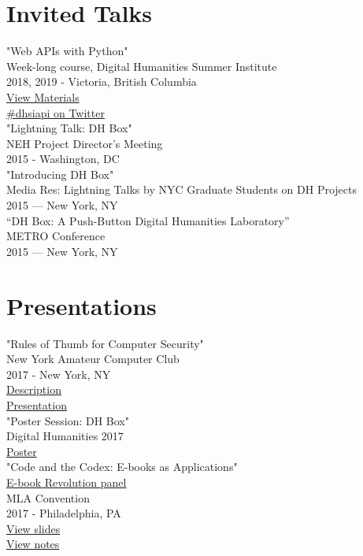 \documentclass[11pt]{article}
\begin{document}
\section*{Invited Talks}
\label{sec:orgheadline6}
"Web APIs with Python"\\
Week-long course, Digital Humanities Summer Institute\\
2018, 2019 - Victoria, British Columbia\\
\href{https://github.com/szweibel/DHSI-API-workshop#web-apis-with-python}{View Materials}\\
\href{https://twitter.com/search?q=\%2523dhsiapi&src=typd}{\#dhsiapi on Twitter}\\

"Lightning Talk: DH Box"\\
NEH Project Director's Meeting\\
2015 - Washington, DC\\

"Introducing DH Box"\\
Media Res: Lightning Talks by NYC Graduate Students on DH Projects\\
2015 — New York, NY\\

“DH Box: A Push-Button Digital Humanities Laboratory”\\
METRO Conference\\
2015 — New York, NY\\

\section*{Presentations}
\label{sec:orgheadline7}
"Rules of Thumb for Computer Security"\\
New York Amateur Computer Club\\
2017 - New York, NY\\
\href{http://nyacc.org/}{Description}\\
\href{http://htmlpreview.github.io/?https://github.com/smythp/security-workshop/blob/master/presentation/index.html#/sec-title-slide}{Presentation}\\

"Poster Session: DH Box"\\
Digital Humanities 2017\\
\href{./resources/dh_box_poster.jpg}{Poster}\\

"Code and the Codex: E-books as Applications"\\
\href{https://apps.mla.org/program_details?prog_id=75&year=2017}{E-book Revolution panel}\\
MLA Convention\\
2017 - Philadelphia, PA\\
\href{http://htmlpreview.github.io/?https://github.com/smythp/ebooks-as-applications/blob/master/presentation.html#/sec-title-slide}{View slides}\\
\href{https://github.com/smythp/ebooks-as-applications#ebooks-as-applications}{View notes}\\
\end{document}
